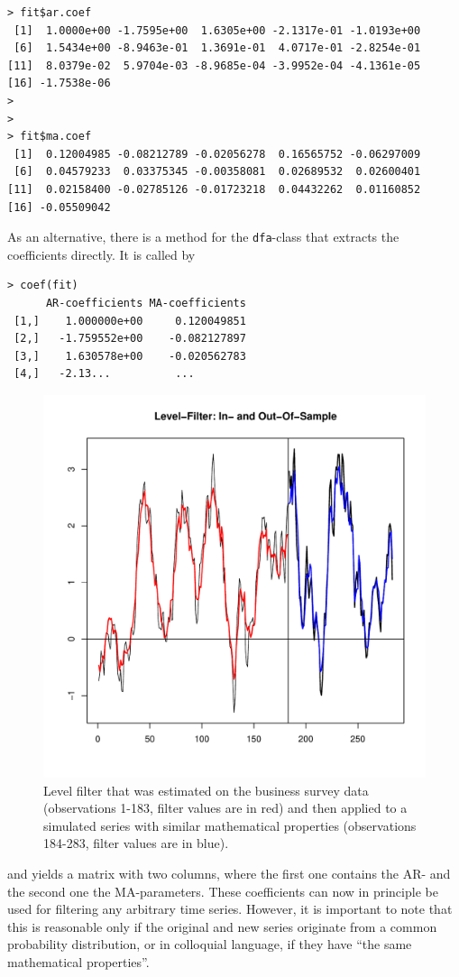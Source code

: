 \documentclass[a4paper]{article}
\begin{document}
\begin{verbatim}
> fit$ar.coef
 [1]  1.0000e+00 -1.7595e+00  1.6305e+00 -2.1317e-01 -1.0193e+00
 [6]  1.5434e+00 -8.9463e-01  1.3691e-01  4.0717e-01 -2.8254e-01
[11]  8.0379e-02  5.9704e-03 -8.9685e-04 -3.9952e-04 -4.1361e-05
[16] -1.7538e-06
>
>
> fit$ma.coef
 [1]  0.12004985 -0.08212789 -0.02056278  0.16565752 -0.06297009
 [6]  0.04579233  0.03375345 -0.00358081  0.02689532  0.02600401
[11]  0.02158400 -0.02785126 -0.01723218  0.04432262  0.01160852
[16] -0.05509042
\end{verbatim}
As an alternative, there is a method for the \texttt{dfa}-class that
extracts the coefficients directly. It is called by
\begin{verbatim}
> coef(fit)
      AR-coefficients MA-coefficients
 [1,]    1.000000e+00     0.120049851
 [2,]   -1.759552e+00    -0.082127897
 [3,]    1.630578e+00    -0.020562783
 [4,]   -2.13...          ... 
\end{verbatim}
\begin{figure}[htb!] 
\begin{center}
\includegraphics[width=\textwidth]{level_in_and_outofsample}
\caption{Level filter that was estimated on the business survey data
  (observations 1-183, filter values are in red) and then applied to a
  simulated series with similar mathematical properties (observations
  184-283, filter values are in blue).\label{fig5}}
\end{center}
\end{figure}
and yields a matrix with two columns, where the first one contains the
AR- and the second one the MA-parameters. These coefficients can now
in principle be used for filtering any arbitrary time series. 
However, it is important to note that this is reasonable only if the
original and new series originate from a common probability
distribution, or in colloquial language, if they have ``the same
mathematical properties''. \\
\end{document}
